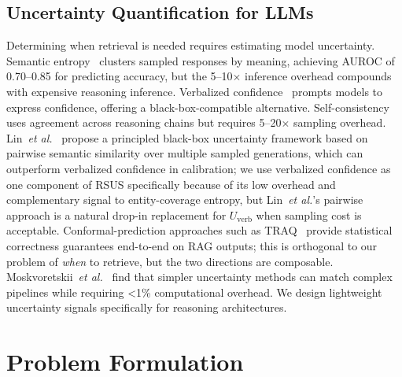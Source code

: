 \documentclass[sigconf,natbib=true]{acmart}
\newcommand{\etal}{\textit{et al.}}
\begin{document}
\subsection{Uncertainty Quantification for LLMs}
Determining when retrieval is needed requires estimating model uncertainty. Semantic entropy~\cite{kuhn2023semantic} clusters sampled responses by meaning, achieving AUROC of 0.70--0.85 for predicting accuracy, but the 5--10$\times$ inference overhead compounds with expensive reasoning inference. Verbalized confidence~\cite{tian2023verbalized} prompts models to express confidence, offering a black-box-compatible alternative. Self-consistency~\cite{wang2023selfconsistency} uses agreement across reasoning chains but requires 5--20$\times$ sampling overhead. Lin~\etal~\cite{lin2024generating} propose a principled black-box uncertainty framework based on pairwise semantic similarity over multiple sampled generations, which can outperform verbalized confidence in calibration; we use verbalized confidence as one component of RSUS specifically because of its low overhead and complementary signal to entity-coverage entropy, but Lin~\etal{}'s pairwise approach is a natural drop-in replacement for $U_{\text{verb}}$ when sampling cost is acceptable. Conformal-prediction approaches such as TRAQ~\cite{li2024traq} provide statistical correctness guarantees end-to-end on RAG outputs; this is orthogonal to our problem of \emph{when} to retrieve, but the two directions are composable. Moskvoretskii~\etal~\cite{Moskvoretskii2025adaptive} find that simpler uncertainty methods can match complex pipelines while requiring <1\% computational overhead. We design lightweight uncertainty signals specifically for reasoning architectures.

\section{Problem Formulation}
\label{sec:problem}
\end{document}
